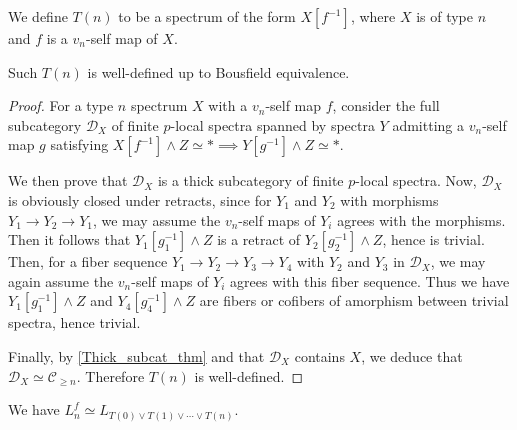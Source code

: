 	\begin{defn}
		We define $T(n)$ to be a spectrum of the form $X[f^{-1}]$, where $X$ is of type $n$ and $f$ is a $v_n$-self map of $X$. 
	\end{defn}

	\begin{prop}\label{Bousfield_class_telescope}
		Such $T(n)$ is well-defined up to Bousfield equivalence. 
	\end{prop}
	\begin{proof}
		For a type $n$ spectrum $X$ with a $v_n$-self map $f$, consider the full subcategory $\mathcal{D}_X$ of finite $p$-local spectra spanned by spectra $Y$ admitting a $v_n$-self map $g$ satisfying $X[f^{-1}]\wedge Z\simeq*\implies Y[g^{-1}]\wedge Z\simeq *$. 

		We then prove that $\mathcal{D}_X$ is a thick subcategory of finite $p$-local spectra. Now, $\mathcal{D}_X$ is obviously closed under retracts, since for $Y_1$ and $Y_2$ with morphisms $Y_1\to Y_2\to Y_1$, we may assume the $v_n$-self maps of $Y_i$ agrees with the morphisms. Then it follows that $Y_1[g_1^{-1}]\wedge Z$ is a retract of $Y_2[g_2^{-1}]\wedge Z$, hence is trivial. Then, for a fiber sequence $Y_1\to Y_2\to Y_3\to Y_4$ with $Y_2$ and $Y_3$ in $\mathcal{D}_X$, we may again assume the $v_n$-self maps of $Y_i$ agrees with this fiber sequence. Thus we have $Y_1[g_1^{-1}]\wedge Z$ and $Y_4[g_4^{-1}]\wedge Z$ are fibers or cofibers of amorphism between trivial spectra, hence trivial. 

		Finally, by \cref{Thick_subcat_thm} and that $\mathcal{D}_X$ contains $X$, we deduce that $\mathcal{D}_X\simeq\mathcal{C}_{\geq n}$. Therefore $T(n)$ is well-defined. 
	\end{proof}
	\begin{coro}\label{Tel_equiv_T_loc}
		We have $L_n^f\simeq L_{T(0)\vee T(1)\vee\cdots\vee T(n)}$. 
	\end{coro}
